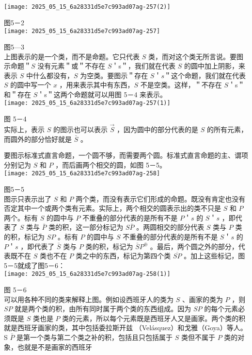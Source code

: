\texttt{[image: 2025\_05\_15\_6a28331d5e7c993ad07ag-257(2)]}

图5－2\\
\texttt{[image: 2025\_05\_15\_6a28331d5e7c993ad07ag-257]}

图5—3\\
上图表示的是一个类，而不是命题。它只代表 $S$ 类，而对这个类无所言说。要图示命题＂$S$ 没有元素＂或＂不存在 $S$＇s＂，我们就在代表 $S$ 的圆中加上阴影，来表示 $S$ 中什么都没有，$S$ 为空类。要图示＂存在 $S$＇$s$＂这个命题，我们就在代表 $S$ 的圆中写一个 $x$ ，用来表示其中有东西，$S$ 不是空类。这样，＂不存在 $S$＇s＂和＂存在 $S$＇s＂这两个命题就可以用图 5－4 来表示。\\
\texttt{[image: 2025\_05\_15\_6a28331d5e7c993ad07ag-257(1)]}

图 5－4\\
实际上，表示 $S$ 的图示也可以表示 $\vec{S}$ ，因为圆中的部分代表的是 $S$ 的所有元素，而圆外的部分恰好就是 $\bar{S}$ 。

要图示标准式直言命题，一个圆不够，而需要两个圆。标准式直言命题的主、谓项分别记为 $S$ 和 $P$ ，而后画两个相交的圆，如图 5－5。\\
\texttt{[image: 2025\_05\_15\_6a28331d5e7c993ad07ag-258]}

图5－5\\
图示只表示出了 $S$ 和 $P$ 两个类，而没有表示它们形成的命题。既没有肯定也没有否定其中一个或两个类有元素。实际上，两个相交的圆表示出的类不只是 $S$ 和 $P$ 两个。标有 $S$ 的圆中与 $P$ 不重叠的部分代表的是所有不是 $P$＇$s$ 的 $S$＇$s$ ，即代表了 $S$ 类与 $\bar{P}$ 类的积，这一部分标记为 $S \bar{P}$ 。两圆相交的部分代表 $S$ 类与 $P$ 类的积，标记为 $S P$ 。标有 $P$ 的圆中与 $S$ 不重叠的部分代表的是所有不是 $S$＇$s$ 的 $P$＇$s$ ，即代表了 $\bar{S}$ 类与 $P$ 类的积，标记为 $\bar{S} P^{\oplus}$ 。最后，两个圆之外的部分，代表既不在 $S$ 类也不在 $P$ 类之中的东西，标记为第四个类 $\overline{S P}$ 。加上这些标记，图5－5就成了图5－6：\\
\texttt{[image: 2025\_05\_15\_6a28331d5e7c993ad07ag-258(1)]}

图 5－6\\
可以用各种不同的类来解释上图。例如设西班牙人的类为 $S$ 、画家的类为 $P$ ，则 $S P$ 就是两个类的积，由所有同时属于两个类的东西组成。因为 $S P$ 的每个元素必须既是 $S$ 类也是 $P$ 类的元素，所以每个元素既是西班牙人又是画家。两个类的积就是西班牙画家的类，其中包括委拉斯开兹 （Velásquez）和戈雅（Goya）等人。S $\bar{P}$ 是第一个类与第二个类之补的积，包括且只包括属于 $S$ 类但不属于 $P$ 类的对象，也就是不是画家的西班牙

